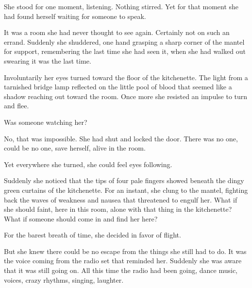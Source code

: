 \documentclass{novel}
\begin{document}
\mainmatter
\cleartorecto
\thispagestyle{empty}


\begin{ChapterStart}
\vspace{3\nbs}
\end{ChapterStart}

She stood for one moment, listening. Nothing stirred. Yet for that moment she had found herself waiting for someone to speak.

It was a room she had never thought to see again. Certainly not on such an errand. Suddenly she shuddered, one hand grasping a sharp corner of the mantel for support, remembering the last time she had seen it, when she had walked out swearing it was the last time.

Involuntarily her eyes turned toward the floor of the kitchenette. The light from a tarnished bridge lamp reflected on the little pool of blood that seemed like a shadow reaching out toward the room. Once more she resisted an impulse to turn and flee.

Was someone watching her?

No, that was impossible. She had shut and locked the door. There was no one, could be no one, save herself, alive in the room.

Yet everywhere she turned, she could feel eyes following.

Suddenly she noticed that the tips of four pale fingers showed beneath the dingy green curtains of the kitchenette. For an instant, she clung to the mantel, fighting back the waves of weakness and nausea that threatened to engulf her. What if she should faint, here in this room, alone with that thing in the kitchenette? What if someone should come in and find her here?

For the barest breath of time, she decided in favor of flight.

But she knew there could be no escape from the things she still had to do. It was the voice coming from the radio set that reminded her. Suddenly she was aware that it was still going on. All this time the radio had been going, dance music, voices, crazy rhythms, singing, laughter.
\end{document}

